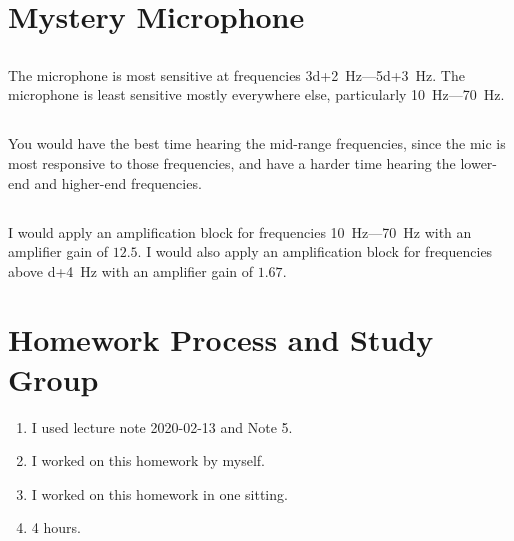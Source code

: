 \documentclass[]{article}
\begin{document}
\section{Mystery Microphone}

\subsection{}

The microphone is most sensitive at frequencies \SI{3d+2}{\hertz}---\SI{5d+3}{\hertz}.
The microphone is least sensitive mostly everywhere else, particularly \SI{10}{\hertz}---\SI{70}{\hertz}.

\subsection{}

You would have the best time hearing the mid-range frequencies, since the mic is most responsive to those frequencies, and have a harder time hearing the lower-end and higher-end frequencies.

\subsection{}

I would apply an amplification block for frequencies \SI{10}{\hertz}---\SI{70}{\hertz} with an amplifier gain of \(12.5\).
I would also apply an amplification block for frequencies above \SI{d+4}{\hertz} with an amplifier gain of \(1.67\).


\section{Homework Process and Study Group}

\begin{enumerate}
	\item I used lecture note 2020-02-13 and Note 5.
	\item I worked on this homework by myself.
	\item I worked on this homework in one sitting.
	\item 4 hours.
\end{enumerate}

\newpage

%
\end{document}
